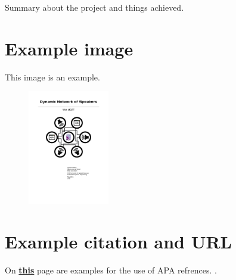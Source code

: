 Summary about the project and things achieved.

\section*{Example image}
This image is an example.

\begin{figure}[h]
    \centering
    \includegraphics[height=5cm]{dynamic_network_of_speakers}
\end{figure}

\section*{Example citation and URL}
On \href{https://en.wikibooks.org/wiki/LaTeX/Bibliography_Management#Standard_templates}{\textbf{this}} page are examples for the use of APA refrences. \cite{BiberTemplates}.

